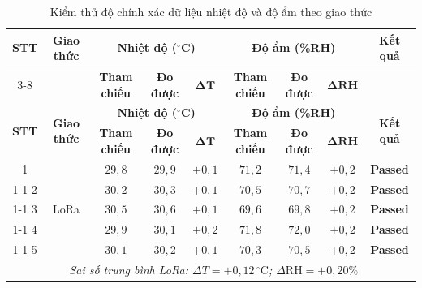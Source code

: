         \begin{longtable}{|c|c|c|c|c|c|c|c|c|}
            \caption{Kiểm thử độ chính xác dữ liệu nhiệt độ và độ ẩm theo giao thức}
            \label{tab:test_data_accuracy} \\
            \hline
            \multirow{2}{*}{\textbf{STT}} &
            \multirow{2}{*}{\textbf{Giao thức}} &
            \multicolumn{3}{c|}{\textbf{Nhiệt độ ($^\circ$C)}} &
            \multicolumn{3}{c|}{\textbf{Độ ẩm (\%RH)}} &
            \multirow{2}{*}{\textbf{Kết quả}} \\ \cline{3-8}
            & & \textbf{Tham chiếu} & \textbf{Đo được} & $\boldsymbol{\Delta T}$ & \textbf{Tham chiếu} & \textbf{Đo được} & $\boldsymbol{\Delta \text{RH}}$ & \\ \hline
            \endfirsthead
            \hline
            \multirow{2}{*}{\textbf{STT}} &
            \multirow{2}{*}{\textbf{Giao thức}} &
            \multicolumn{3}{c|}{\textbf{Nhiệt độ ($^\circ$C)}} &
            \multicolumn{3}{c|}{\textbf{Độ ẩm (\%RH)}} &
            \multirow{2}{*}{\textbf{Kết quả}} \\ \cline{3-8}
            & & \textbf{Tham chiếu} & \textbf{Đo được} & $\boldsymbol{\Delta T}$ & \textbf{Tham chiếu} & \textbf{Đo được} & $\boldsymbol{\Delta \text{RH}}$ & \\ \hline
            \endhead
            \hline
            \endfoot
            \endlastfoot

            1 & \multirow{5}{*}{LoRa} & $29{,}8$ & $29{,}9$ & $+0{,}1$ & $71{,}2$ & $71{,}4$ & $+0{,}2$ & \textcolor{modern_blue}{\textbf{Passed}} \\ \cline{1-1}\cline{3-9}
            2 & & $30{,}2$ & $30{,}3$ & $+0{,}1$ & $70{,}5$ & $70{,}7$ & $+0{,}2$ & \textcolor{modern_blue}{\textbf{Passed}} \\ \cline{1-1}\cline{3-9}
            3 & & $30{,}5$ & $30{,}6$ & $+0{,}1$ & $69{,}6$ & $69{,}8$ & $+0{,}2$ & \textcolor{modern_blue}{\textbf{Passed}} \\ \cline{1-1}\cline{3-9}
            4 & & $29{,}9$ & $30{,}1$ & $+0{,}2$ & $71{,}8$ & $72{,}0$ & $+0{,}2$ & \textcolor{modern_blue}{\textbf{Passed}} \\ \cline{1-1}\cline{3-9}
            5 & & $30{,}1$ & $30{,}2$ & $+0{,}1$ & $70{,}3$ & $70{,}5$ & $+0{,}2$ & \textcolor{modern_blue}{\textbf{Passed}} \\ \hline

            \multicolumn{8}{|r|}{\textit{Sai số trung bình LoRa: $\overline{\Delta T} = +0{,}12\,{^\circ}\text{C}$; $\overline{\Delta \text{RH}} = +0{,}20\%$}} & \\ \hline


\end{longtable}

